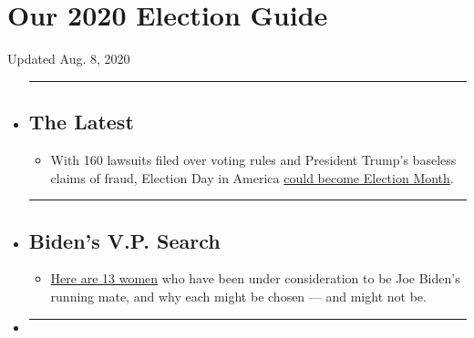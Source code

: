 \hypertarget{our-2020-election-guide}{%
\section{Our 2020 Election Guide}\label{our-2020-election-guide}}

Updated Aug. 8, 2020

\begin{itemize}
\item
  \begin{center}\rule{0.5\linewidth}{\linethickness}\end{center}

  \hypertarget{the-latest}{%
  \subsection{The Latest}\label{the-latest}}

  \begin{itemize}
  \tightlist
  \item
    With 160 lawsuits filed over voting rules and President Trump's
    baseless claims of fraud, Election Day in America
    \href{https://www.nytimes.com/2020/08/08/us/politics/voting-nov-3-election.html?action=click\&pgtype=Article\&state=default\&region=BELOW_MAIN_CONTENT\&context=storylines_guide}{could
    become Election Month}.
  \end{itemize}
\item
  \begin{center}\rule{0.5\linewidth}{\linethickness}\end{center}

  \hypertarget{bidens-vp-search}{%
  \subsection{Biden's V.P. Search}\label{bidens-vp-search}}

  \begin{itemize}
  \tightlist
  \item
    \href{https://www.nytimes.com/article/biden-vice-president-2020.html?action=click\&pgtype=Article\&state=default\&region=BELOW_MAIN_CONTENT\&context=storylines_guide}{Here
    are 13 women} who have been under consideration to be Joe Biden's
    running mate, and why each might be chosen --- and might not be.
  \end{itemize}
\item
  \begin{center}\rule{0.5\linewidth}{\linethickness}\end{center}


\end{itemize}
